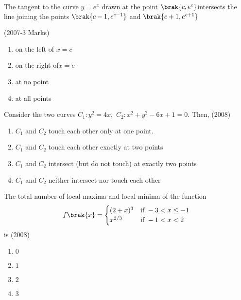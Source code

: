    
   
      \item 
 The tangent to the curve $y=e^x$ drawn at the point $\brak{c,e^c}$intersects the line joining the points $\brak{c-1,e^{c-1}}$ and $\brak{c+1,e^{c+1}}$
    
      \hfill(2007-3 Marks)
      \begin{enumerate}
       \item on the left of $x=c$
       \item on the right of$x=c$ 
       \item at no point  
       \item at all points\\
      \end{enumerate}

   
      \item
	      Consider the two curves $C_{1}:y^2=4x,$  $C_{2}:x^2+y^2-6x+1=0.$ Then,  \hfill(2008)
     \begin{enumerate}
      \item $C_{1}$ and $C_{2}$ touch each other only at one point.
    
      \item $C_{1}$ and $C_{2}$ touch each other exactly at two points

      \item $C_{1}$ and $C_{2}$ intersect (but do not touch) at exactly two points

      \item $C_{1}$ and $C_{2}$ neither intersect nor touch each other \\
     
    \end{enumerate}
 
    \item 
    The total number of local maxima and local minima of the function \\
    \begin{align*}
      f\brak{x}=
      \begin{cases} 
       (2+x)^3 & \text{if } -3<x\le -1\\
       x^{2/3} & \text{if } -1<x<2
      \end{cases}
    \end{align*}is
   \hfill(2008)
    \begin{enumerate}
     \item $0$ 
     \item $1$
     \item $2$ 
     \item $3$ \\
    \end{enumerate}   


